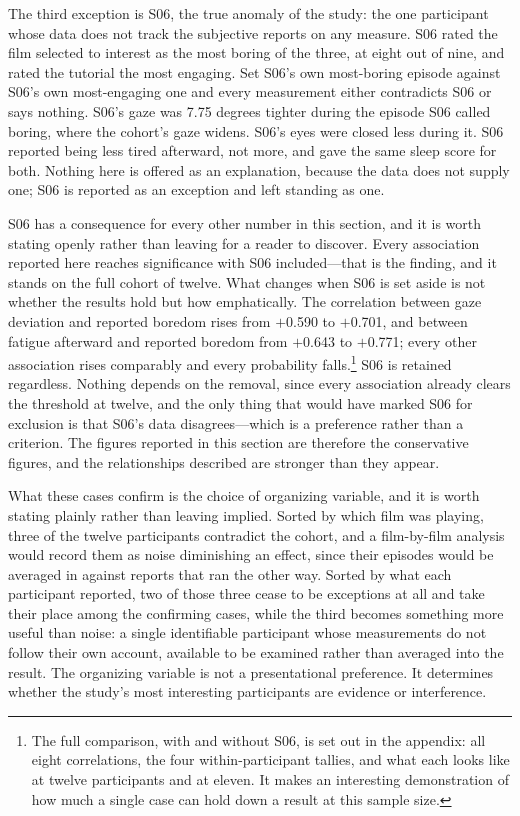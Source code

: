 The third exception is S06, the true anomaly of the study: the one participant whose data does
not track the subjective reports on any measure. S06 rated the film selected to interest
as the most boring of the three, at eight out of nine, and rated the tutorial the most engaging.
Set S06's own most-boring episode against S06's own most-engaging one and every measurement
either contradicts S06 or says nothing. S06's gaze was 7.75 degrees tighter during the episode
S06 called boring, where the cohort's gaze widens. S06's eyes were closed less during it. S06
reported being less tired afterward, not more, and gave the same sleep score for both. Nothing
here is offered as an explanation, because the data does not supply one; S06 is reported as an
exception and left standing as one.

S06 has a consequence for every other number in this section, and it is worth stating openly
rather than leaving for a reader to discover. Every association reported here reaches
significance with S06 included---that is the finding, and it stands on the full cohort of
twelve. What changes when S06 is set aside is not whether the results hold but how emphatically.
The correlation between gaze deviation and reported boredom rises from $+$0.590 to $+$0.701, and
between fatigue afterward and reported boredom from $+$0.643 to $+$0.771; every other
association rises comparably and every probability falls.\footnote{The full comparison, with and
without S06, is set out in the appendix: all eight correlations, the four within-participant
tallies, and what each looks like at twelve participants and at eleven. It makes an interesting
demonstration of how much a single case can hold down a result at this sample size.} S06 is
retained regardless. Nothing depends on the removal, since every association already clears the
threshold at twelve, and the only thing that would have marked S06 for exclusion is that S06's
data disagrees---which is a preference rather than a criterion. The figures reported in this
section are therefore the conservative figures, and the relationships described are stronger
than they appear.

What these cases confirm is the choice of organizing variable, and it is worth stating plainly
rather than leaving implied. Sorted by which film was playing, three of the twelve participants
contradict the cohort, and a film-by-film analysis would record them as noise diminishing an
effect, since their episodes would be averaged in against reports that ran the other way. Sorted by what each participant reported, two of those three cease to be
exceptions at all and take their place among the confirming cases, while the third becomes
something more useful than noise: a single identifiable participant whose measurements do not
follow their own account, available to be examined rather than averaged into the result. The
organizing variable is not a presentational preference. It determines whether the study's most
interesting participants are evidence or interference.

